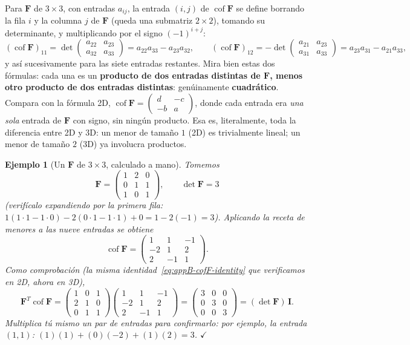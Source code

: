 \documentclass[11pt,a4paper]{article}
\newtheorem{ejemplo}{Ejemplo}
\newcommand{\Cof}{\operatorname{cof}}
\begin{document}
Para $\bm F$ de $3\times3$, con entradas $a_{ij}$, la entrada
$(i,j)$ de $\Cof\bm F$ se define borrando la fila $i$ y la columna $j$
de $\bm F$ (queda una submatriz $2\times2$), tomando su determinante, y
multiplicando por el signo $(-1)^{i+j}$:
\[
 (\Cof\bm F)_{11}=\det\begin{pmatrix}a_{22}&a_{23}\\a_{32}&a_{33}\end{pmatrix}
 =a_{22}a_{33}-a_{23}a_{32},
 \qquad
 (\Cof\bm F)_{12}=-\det\begin{pmatrix}a_{21}&a_{23}\\a_{31}&a_{33}\end{pmatrix}
 =a_{23}a_{31}-a_{21}a_{33},
\]
y as\'i sucesivamente para las siete entradas restantes. Mira bien
estas dos f\'ormulas: cada una es un \textbf{producto de dos entradas
distintas de $\bm F$, menos otro producto de dos entradas distintas}:
gen\'uinamente \textbf{cuadr\'atico}. Compara con la f\'ormula 2D,
$\Cof\bm F=\begin{pmatrix}d&-c\\-b&a\end{pmatrix}$, donde cada entrada
era \emph{una sola} entrada de $\bm F$ con signo, sin ning\'un
producto. Esa es, literalmente, toda la diferencia entre 2D y 3D: un
menor de tama\~no $1$ (2D) es trivialmente lineal; un menor de tama\~no
$2$ (3D) ya involucra productos.

\begin{ejemplo}[Un $\bm F$ de $3\times3$, calculado a mano]
\label{ex:appB-cofF-3d}
Tomemos
\[
 \bm F=\begin{pmatrix}1&2&0\\0&1&1\\1&0&1\end{pmatrix},
 \qquad \det\bm F=3
\]
(verif\'icalo expandiendo por la primera fila:
$1(1\cdot1-1\cdot0)-2(0\cdot1-1\cdot1)+0=1-2(-1)=3$). Aplicando la
receta de menores a las nueve entradas se obtiene
\[
 \Cof\bm F=\begin{pmatrix}1&1&-1\\-2&1&2\\2&-1&1\end{pmatrix}.
\]
Como comprobaci\'on (la misma identidad~\eqref{eq:appB-cofF-identity}
que verificamos en 2D, ahora en 3D),
\[
 \bm F^T\Cof\bm F=\begin{pmatrix}1&0&1\\2&1&0\\0&1&1\end{pmatrix}
 \begin{pmatrix}1&1&-1\\-2&1&2\\2&-1&1\end{pmatrix}
 =\begin{pmatrix}3&0&0\\0&3&0\\0&0&3\end{pmatrix}=(\det\bm F)\,\bm I.
\]
Multiplica t\'u mismo un par de entradas para confirmarlo: por
ejemplo, la entrada $(1,1)$: $(1)(1)+(0)(-2)+(1)(2)=3$. $\checkmark$
\end{ejemplo}
\end{document}
